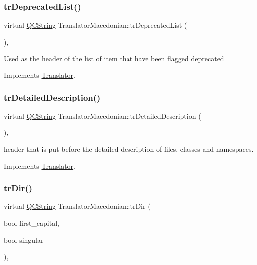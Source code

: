 \subsubsection{\texorpdfstring{trDeprecatedList()}{trDeprecatedList()}}
{\footnotesize\ttfamily virtual \mbox{\hyperlink{class_q_c_string}{Q\+C\+String}} Translator\+Macedonian\+::tr\+Deprecated\+List (\begin{DoxyParamCaption}{ }\end{DoxyParamCaption})\hspace{0.3cm}{\ttfamily [inline]}, {\ttfamily [virtual]}}

Used as the header of the list of item that have been flagged deprecated 

Implements \mbox{\hyperlink{class_translator}{Translator}}.

\mbox{\label{class_translator_macedonian_a5d1ad73e507a3b4c3807aa3929b934ed}} 
\subsubsection{\texorpdfstring{trDetailedDescription()}{trDetailedDescription()}}
{\footnotesize\ttfamily virtual \mbox{\hyperlink{class_q_c_string}{Q\+C\+String}} Translator\+Macedonian\+::tr\+Detailed\+Description (\begin{DoxyParamCaption}{ }\end{DoxyParamCaption})\hspace{0.3cm}{\ttfamily [inline]}, {\ttfamily [virtual]}}

header that is put before the detailed description of files, classes and namespaces. 

Implements \mbox{\hyperlink{class_translator}{Translator}}.

\mbox{\label{class_translator_macedonian_afbffb3f70b05f35bbdf9b3095c46c4a2}} 
\subsubsection{\texorpdfstring{trDir()}{trDir()}}
{\footnotesize\ttfamily virtual \mbox{\hyperlink{class_q_c_string}{Q\+C\+String}} Translator\+Macedonian\+::tr\+Dir (\begin{DoxyParamCaption}\item[{bool}]{first\+\_\+capital,  }\item[{bool}]{singular }\end{DoxyParamCaption})\hspace{0.3cm}{\ttfamily [inline]}, {\ttfamily [virtual]}}

